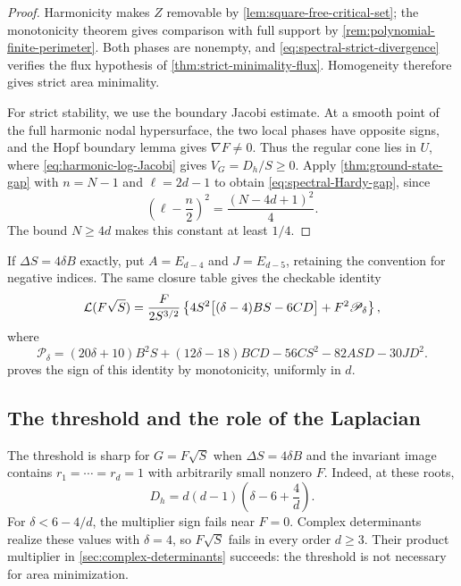 \begin{proof}
Harmonicity makes \(Z\) removable by
\cref{lem:square-free-critical-set}; the monotonicity theorem gives
comparison with full support by \cref{rem:polynomial-finite-perimeter}.
Both phases are nonempty, and \eqref{eq:spectral-strict-divergence}
verifies the flux hypothesis of \cref{thm:strict-minimality-flux}.
Homogeneity therefore gives strict area minimality.

For strict stability, we use the boundary Jacobi estimate.
At a smooth point of the full harmonic
nodal hypersurface, the
two local phases have opposite signs, and the Hopf boundary lemma
gives \(\nabla F\ne0\). Thus the regular cone lies in \(U\), where
\eqref{eq:harmonic-log-Jacobi} gives
\(V_G=D_h/S\ge0\). Apply \cref{thm:ground-state-gap} with
\(n=N-1\) and \(\ell=2d-1\) to obtain
\eqref{eq:spectral-Hardy-gap}, since
\[
 \left(\ell-\frac n2\right)^2
 =\frac{(N-4d+1)^2}{4}.
\]
The bound \(N\ge4d\) makes this constant at least \(1/4\).
\end{proof}

\begin{remark}
\label{rem:spectral-explicit-certificate}
If \(\Delta S=4\delta B\) exactly, put
\(A=E_{d-4}\) and \(J=E_{d-5}\), retaining the convention for
negative indices.  The same closure table gives the checkable identity
\begin{equation}\label{eq:spectral-explicit-certificate}
 \mathcal L(F\sqrt S)=\frac{F}{2S^{3/2}}
 \left\{4S^2\bigl[(\delta-4)BS-6CD\bigr]+F^2\mathscr P_\delta\right\},
\end{equation}
where
\[
 \mathscr P_\delta=(20\delta+10)B^2S+(12\delta-18)BCD
                    -56CS^2-82ASD-30JD^2.
\]
 proves the sign of this
identity by monotonicity, uniformly in \(d\).
\end{remark}

\subsection{The threshold and the role of the Laplacian}

The threshold is sharp for \(G=F\sqrt S\) when
\(\Delta S=4\delta B\) and the invariant image contains
\(r_1=\cdots=r_d=1\) with arbitrarily small nonzero \(F\).
Indeed, at these roots,
\begin{equation}\label{eq:spectral-balanced-defect}
 D_h=d(d-1)\left(\delta-6+\frac4d\right).
\end{equation}
For \(\delta<6-4/d\), the multiplier sign fails near \(F=0\).
Complex determinants realize these values with \(\delta=4\), so
\(F\sqrt S\) fails in every order \(d\ge3\). Their product multiplier
in \cref{sec:complex-determinants} succeeds: the threshold is not
necessary for area minimization.

